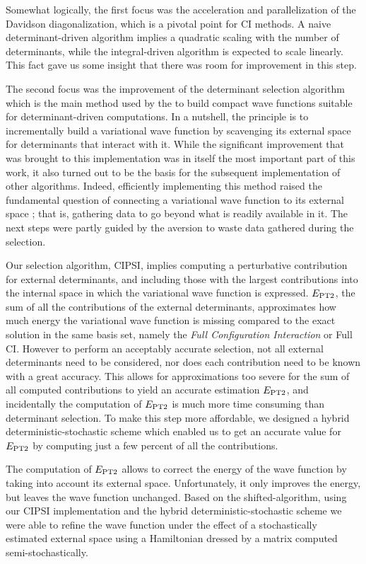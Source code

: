 \documentclass[12pt,a4paper]{report}
\begin{document}
Somewhat logically, the first focus was the acceleration and parallelization of the
Davidson diagonalization, which is a pivotal point for CI methods.
A naive determinant-driven algorithm implies a quadratic scaling with the
number of determinants, while the integral-driven algorithm is expected to
scale linearly. This fact gave us some insight that there was room for
improvement in this step. 

The second focus was the improvement of the determinant selection algorithm
which is the main method used by the \QP to build compact wave functions
suitable for determinant-driven computations. In a nutshell, the principle is
to incrementally build a variational wave function by scavenging its external
space for determinants that interact with it. While the significant
improvement that was brought to this implementation was in itself the most
important part of this work, it also turned out to be the basis for the subsequent
implementation of other algorithms. Indeed, efficiently implementing this
method raised the fundamental question of connecting a variational wave function
to its external space ; that is, gathering data to go beyond what is readily
available in it. The next steps were partly guided by the aversion to waste
data gathered during the selection.

Our selection algorithm, CIPSI, implies computing a perturbative contribution
for external determinants, and including those with the largest contributions into
the internal space in which the variational wave function is expressed.
$E_\text{PT2}$, the sum of all the contributions of the external determinants,
approximates how much energy the variational wave function is missing compared
to  the exact solution in the same basis set, namely the \emph{Full Configuration Interaction} or Full CI. However to
perform an acceptably accurate selection, not all external determinants need to
be considered, nor does each contribution need to be known with a great accuracy.\cite{Evangelisti_1983}
This allows for approximations too severe for the sum of all computed
contributions to yield an accurate estimation $E_\text{PT2}$, and incidentally the computation
of $E_\text{PT2}$ is much more time consuming than determinant selection. To
make this step more affordable, we designed a hybrid deterministic-stochastic
scheme which enabled us to get an accurate value for $E_\text{PT2}$ by
computing just a few percent of all the contributions.

The computation of $E_\text{PT2}$ allows to correct the energy of the 
wave function by taking into account its external space. Unfortunately, it only
improves the energy, but leaves the wave function unchanged. Based on the
shifted-\Bk algorithm, using our CIPSI implementation and the hybrid
deterministic-stochastic scheme we were able to refine the wave function under
the effect of a stochastically estimated external space using
a Hamiltonian dressed by a matrix computed semi-stochastically.
\end{document}
